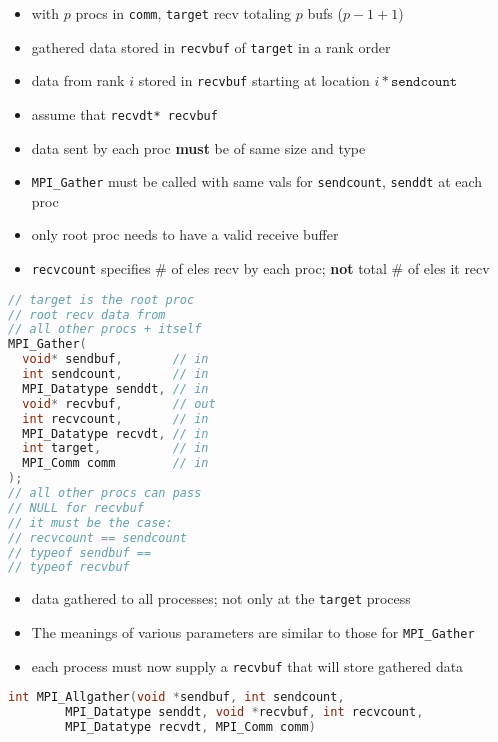 \begin{minipage}{0.5\linewidth}
  \flushleft
  \begin{itemize}
  \item with $p$ procs in \texttt{comm}, \texttt{target} recv totaling $p$ bufs ($p-1+1$)
  \item gathered data stored in \texttt{recvbuf} of \texttt{target} in a rank order
  \item data from rank $i$ stored in \texttt{recvbuf} starting at location $i* \texttt{sendcount}$
  \item assume that \texttt{recvdt* recvbuf}
  \item data sent by each proc \textbf{must} be of same size and type
  \item \texttt{MPI\_Gather} must be called with same vals for \texttt{sendcount}, \texttt{senddt} at each proc
  \item only root proc needs to have a valid receive buffer
  \item \texttt{recvcount} specifies $\#$ of eles recv by each proc; \textbf{not} total $\#$ of eles it recv
  \end{itemize}
\end{minipage}
\begin{minipage}{0.5\linewidth}
\begin{lstlisting}[language=c,xleftmargin=1pt]
// target is the root proc
// root recv data from
// all other procs + itself
MPI_Gather(
  void* sendbuf,       // in
  int sendcount,       // in
  MPI_Datatype senddt, // in
  void* recvbuf,       // out
  int recvcount,       // in
  MPI_Datatype recvdt, // in
  int target,          // in
  MPI_Comm comm        // in
);
// all other procs can pass
// NULL for recvbuf
// it must be the case:
// recvcount == sendcount
// typeof sendbuf ==
// typeof recvbuf
\end{lstlisting}
\end{minipage}

\begin{itemize}
  \item data gathered to all processes; not only at the \texttt{target} process
  \item The meanings of various parameters are similar to those for \texttt{MPI\_Gather}
  \item each process must now supply a \texttt{recvbuf} that will store gathered data
  \end{itemize}

\begin{lstlisting}[language=C]
int MPI_Allgather(void *sendbuf, int sendcount,
        MPI_Datatype senddt, void *recvbuf, int recvcount,
        MPI_Datatype recvdt, MPI_Comm comm)
\end{lstlisting}
